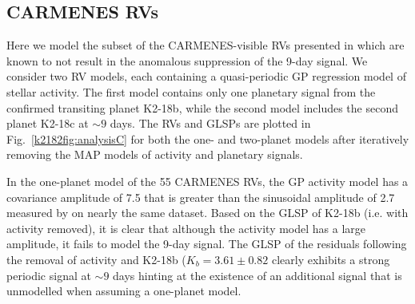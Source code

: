 \subsection{CARMENES RVs} \label{k2182sect:analysisC}
Here we model the subset of the CARMENES-visible RVs presented in  which are known to
not result in the anomalous suppression of the 9-day signal. We consider two RV models, each containing
a quasi-periodic GP regression model of stellar activity. The first model contains only one planetary
signal from the confirmed transiting planet K2-18b, while the second model  includes the
second planet K2-18c at $\sim 9$ days.
The RVs and GLSPs are plotted in Fig.~\ref{k2182fig:analysisC} for both the one- and two-planet models after
iteratively removing the MAP models of activity and planetary signals.

In the one-planet model  of the 55 CARMENES RVs, the GP activity model has a covariance amplitude of
7.5 \mps{} that is greater than the sinusoidal amplitude of 2.7 \mps{} measured by 
on nearly the same dataset. Based on the GLSP of K2-18b (i.e. with activity removed), it is clear that
although the activity model has a large amplitude, it fails to model the 9-day signal. The
GLSP of the residuals following the removal of activity and K2-18b ($K_b=3.61 \pm 0.82$ \mps{)} clearly
exhibits a strong periodic signal at $\sim 9$ days hinting at the existence of an additional signal that
is unmodelled when assuming a one-planet model.

